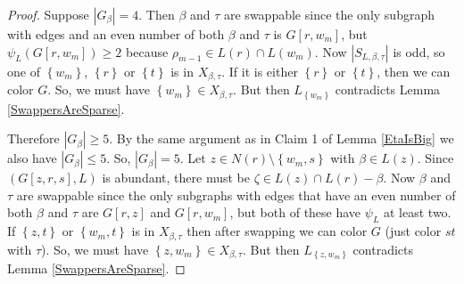 \documentclass[12pt]{article}
\theoremstyle{plain}
\theoremstyle{definition}
\theoremstyle{remark}
\newcommand{\set}[1]{\left\{ #1 \right\}}
\newcommand{\card}[1]{\left|#1\right|}
\begin{document}
\begin{proof}
			 Suppose $|G_\beta| = 4$. Then $\beta$ and $\tau$ are swappable since the only subgraph with edges and an even number of both $\beta$ and $\tau$ is $G[r,w_m]$, but $\psi_L(G[r,w_m]) \ge 2$ because $\rho_{m-1} \in L(r) \cap L(w_m)$.  Now $\card{S_{L, \beta, \tau}}$ is odd, so one of $\set{w_m}$, $\set{r}$ or $\set{t}$ is in $X_{\beta, \tau}$.  If it is either $\set{r}$ or $\set{t}$, then we can color $G$.  So, we must have $\set{w_m} \in X_{\beta, \tau}$.  But then $L_{\set{w_m}}$ contradicts Lemma \ref{SwappersAreSparse}.
			 
			 Therefore $|G_\beta| \ge 5$.  By the same argument as in Claim 1 of Lemma \ref{EtaIsBig} we also have $|G_\beta| \le 5$.  So, $|G_\beta| = 5$.  Let $z \in N(r) \setminus \set{w_m, s}$ with $\beta \in L(z)$.  Since $(G[z,r,s], L)$ is abundant, there must be $\zeta \in L(z) \cap L(r) - \beta$.  Now $\beta$ and $\tau$ are swappable since the only subgraphs with edges that have an even number of both $\beta$ and $\tau$ are $G[r,z]$ and $G[r,w_m]$, but both of these have $\psi_L$ at least two.  If $\set{z, t}$ or $\set{w_m,t}$ is in $X_{\beta, \tau}$ then after swapping we can color $G$ (just color $st$ with $\tau$).  So, we must have $\set{z,w_m} \in X_{\beta, \tau}$.   But then $L_{\set{z,w_m}}$ contradicts Lemma \ref{SwappersAreSparse}.
	\end{proof}
\end{document}
